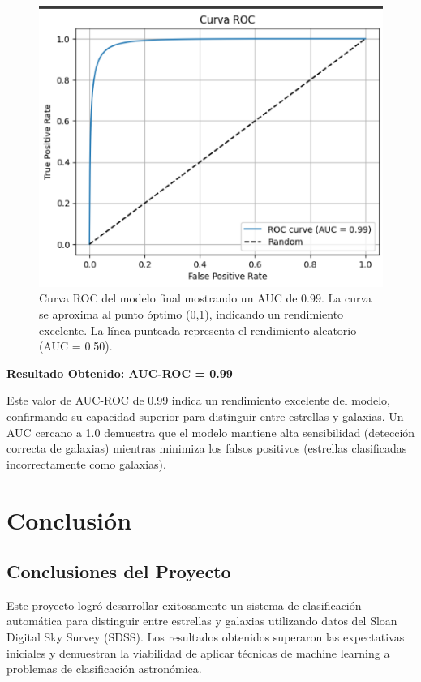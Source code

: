 \documentclass{article}
\begin{document}
\begin{figure}[H]
    \centering
    \includegraphics[width=0.6\linewidth]{ROC.png}
    \caption{Curva ROC del modelo final mostrando un AUC de 0.99. La curva se aproxima al punto óptimo (0,1), indicando un rendimiento excelente. La línea punteada representa el rendimiento aleatorio (AUC = 0.50).}
    \label{fig:roc_curve}
\end{figure}

\textbf{Resultado Obtenido: AUC-ROC = 0.99}

Este valor de AUC-ROC de 0.99 indica un rendimiento excelente del modelo, confirmando su capacidad superior para distinguir entre estrellas y galaxias. Un AUC cercano a 1.0 demuestra que el modelo mantiene alta sensibilidad (detección correcta de galaxias) mientras minimiza los falsos positivos (estrellas clasificadas incorrectamente como galaxias).

\newpage

\section{Conclusión}

\subsection{Conclusiones del Proyecto}

Este proyecto logró desarrollar exitosamente un sistema de clasificación automática para distinguir entre estrellas y galaxias utilizando datos del Sloan Digital Sky Survey (SDSS). Los resultados obtenidos superaron las expectativas iniciales y demuestran la viabilidad de aplicar técnicas de machine learning a problemas de clasificación astronómica.
\end{document}
